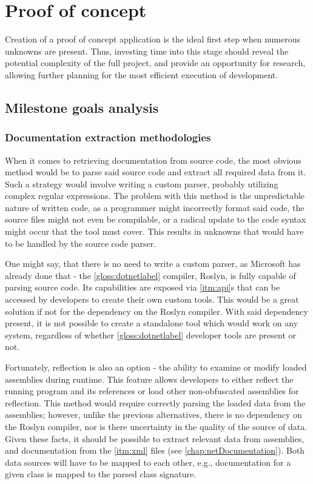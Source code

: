 \chapter{Proof of concept} \label{chap:proofConcept}

Creation of a proof of concept application is the ideal first step when numerous unknowns are present. Thus, investing time into this stage should reveal the potential complexity of the full project, and provide an opportunity for research, allowing further planning for the most efficient execution of development.

\section{Milestone goals analysis}

\subsection{Documentation extraction methodologies}
When it comes to retrieving documentation from source code, the most obvious method would be to parse said source code and extract all required data from it. Such a strategy would involve writing a custom parser, probably utilizing complex regular expressions. The problem with this method is the unpredictable nature of written code, as a programmer might incorrectly format said code, the source files might not even be compilable, or a radical update to the code syntax might occur that the tool must cover. This results in unknowns that would have to be handled by the source code parser.

One might say, that there is no need to write a custom parser, as Microsoft has already done that - the \ref{gloss:dotnetlabel} compiler, Roslyn, is fully capable of parsing source code. Its capabilities are exposed via \ref{itm:api}s that can be accessed by developers to create their own custom tools. This would be a great solution if not for the dependency on the Roslyn compiler. With said dependency present, it is not possible to create a standalone tool which would work on any system, regardless of whether \ref{gloss:dotnetlabel} developer tools are present or not.

Fortunately, reflection is also an option - the ability to examine or modify loaded assemblies during runtime. This feature allows developers to either reflect the running program and its references or load other non-obfuscated assemblies for reflection. This method would require correctly parsing the loaded data from the assemblies; however, unlike the previous alternatives, there is no dependency on the Roslyn compiler, nor is there uncertainty in the quality of the source of data. Given these facts, it should be possible to extract relevant data from assemblies, and documentation from the \ref{itm:xml} files (see \ref{chap:netDocumentation}). Both data sources will have to be mapped to each other, e.g., documentation for a given class is mapped to the parsed class signature.

